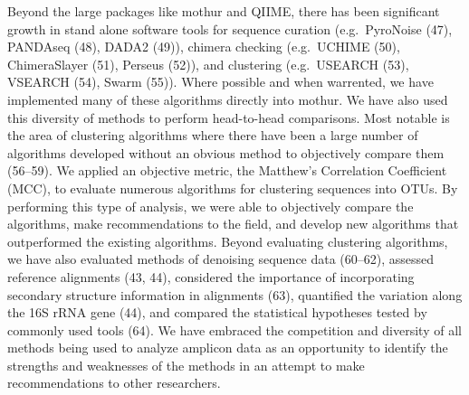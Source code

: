 \documentclass[11pt,]{article}
\begin{document}
Beyond the large packages like mothur and QIIME, there has been
significant growth in stand alone software tools for sequence curation
(e.g.~PyroNoise (47), PANDAseq (48), DADA2 (49)), chimera checking
(e.g.~UCHIME (50), ChimeraSlayer (51), Perseus (52)), and clustering
(e.g.~USEARCH (53), VSEARCH (54), Swarm (55)). Where possible and when
warrented, we have implemented many of these algorithms directly into
mothur. We have also used this diversity of methods to perform
head-to-head comparisons. Most notable is the area of clustering
algorithms where there have been a large number of algorithms developed
without an obvious method to objectively compare them (56--59). We
applied an objective metric, the Matthew's Correlation Coefficient
(MCC), to evaluate numerous algorithms for clustering sequences into
OTUs. By performing this type of analysis, we were able to objectively
compare the algorithms, make recommendations to the field, and develop
new algorithms that outperformed the existing algorithms. Beyond
evaluating clustering algorithms, we have also evaluated methods of
denoising sequence data (60--62), assessed reference alignments (43,
44), considered the importance of incorporating secondary structure
information in alignments (63), quantified the variation along the 16S
rRNA gene (44), and compared the statistical hypotheses tested by
commonly used tools (64). We have embraced the competition and diversity
of all methods being used to analyze amplicon data as an opportunity to
identify the strengths and weaknesses of the methods in an attempt to
make recommendations to other researchers.
\end{document}
